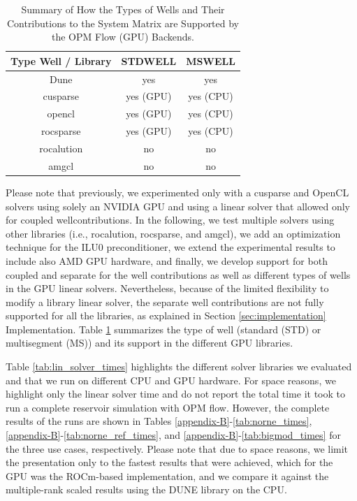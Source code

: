 \begin{table}[h!]
\centering
\begin{tabular}{c|c|c}
Type Well / Library & STDWELL & MSWELL \\\hline
Dune & yes & yes \\ 
cusparse & yes (GPU) & yes (CPU) \\ 
opencl & yes (GPU) & yes (CPU) \\ 
rocsparse & yes (GPU) & yes (CPU) \\ 
rocalution & no & no \\ 
amgcl & no & no \\ 
\end{tabular}
\caption{Summary of How the Types of Wells and Their Contributions to the System Matrix are Supported by the OPM Flow (GPU) Backends.}
\label{tab:wells}
\end{table}

Please note that previously, we experimented only with a cusparse and OpenCL solvers using solely an NVIDIA GPU and using a linear solver that allowed only for coupled wellcontributions. In the following, we test multiple solvers using other libraries (i.e., rocalution, rocsparse, and amgcl), we add an optimization technique for the ILU0 preconditioner, we extend the experimental results to include also AMD GPU hardware, and finally, we develop support for both coupled and separate for the well contributions as well as different types of wells in the GPU linear solvers. Nevertheless, because of the limited flexibility to modify a library linear solver, the separate well contributions are not fully supported for all the libraries, as explained in Section \ref{sec:implementation} Implementation. Table \ref{tab:wells} summarizes the type of well (standard (STD) or multisegment (MS)) and its support in the different GPU libraries. 

Table \ref{tab:lin_solver_times} highlights the different solver libraries we evaluated and that we run on different CPU and GPU hardware. For space reasons, we highlight only the linear solver time and do not report the total time it took to run a complete reservoir simulation with OPM flow. However, the complete results of the runs are shown in Tables \ref{appendix-B}-\ref{tab:norne_times}, \ref{appendix-B}-\ref{tab:norne_ref_times}, and \ref{appendix-B}-\ref{tab:bigmod_times} for the three use cases, respectively. Please note that due to space reasons, we limit the presentation only to the fastest results that were achieved, which for the GPU was the ROCm-based implementation, and we compare it against the multiple-rank scaled results using the DUNE library on the CPU.

